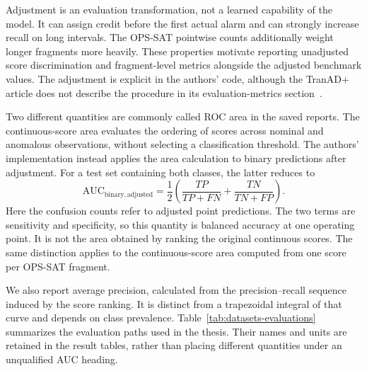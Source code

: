 Adjustment is an evaluation transformation, not a learned capability of
the model. It can assign credit before the first actual alarm and can
strongly increase recall on long intervals. The \ac{OPS-SAT} pointwise
counts additionally weight longer fragments more heavily. These properties
motivate reporting unadjusted score discrimination and fragment-level
metrics alongside the adjusted benchmark values. The adjustment is explicit
in the authors' code, although the TranAD+ article does not describe the
procedure in its evaluation-metrics section~\cite{TranADPlusReferenceCode,Yermakov2025TranADPlus}.

Two different quantities are commonly called \ac{ROC} area in the saved
reports. The continuous-score area evaluates the ordering of scores across
nominal and anomalous observations, without selecting a classification
threshold. The authors' implementation instead applies the area calculation
to binary predictions after adjustment. For a test set containing both
classes, the latter reduces to
\begin{equation}
  \mathrm{AUC}_{\mathrm{binary,adjusted}}
  =\frac{1}{2}\left(
      \frac{TP}{TP+FN}+\frac{TN}{TN+FP}
    \right).
  \label{eq:datasets-binary-auc}
\end{equation}
Here the confusion counts refer to adjusted point predictions. The two
terms are sensitivity and specificity, so this quantity is balanced
accuracy at one operating point. It is not the area obtained by ranking
the original continuous scores. The same distinction applies to the
continuous-score area computed from one score per \ac{OPS-SAT} fragment.

We also report average precision, calculated from the precision--recall
sequence induced by the score ranking. It is distinct from a trapezoidal
integral of that curve and depends on class prevalence. Table~\ref{tab:datasets-evaluations}
summarizes the evaluation paths used in the thesis. Their names and units
are retained in the result tables, rather than placing different quantities
under an unqualified AUC heading.

